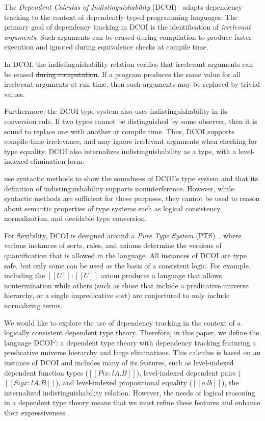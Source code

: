\documentclass[acmsmall, screen=true, nonacm=true,
  review=\ifpublic false\else true\fi,
  anonymous=\ifanonymous true\else false\fi
]{acmart}
\makeatletter
\newcommand{\dcoi}{DCOI\@\xspace}
\newcommand{\name}{\texorpdfstring{DCOI$^{\omega}$\@\xspace}{DCOI-omega}}
\newcommand{\longname}{Dependent Calculus of Indistinguishability\@\xspace}
\providecommand{\DIFadd}[1]{{\protect\color{blue}\uwave{#1}}} %
\providecommand{\DIFdel}[1]{{\protect\color{red}\sout{#1}}}                      %
\providecommand{\DIFaddbegin}{} %
\providecommand{\DIFaddend}{} %
\providecommand{\DIFdelbegin}{} %
\providecommand{\DIFdelend}{} %
\makeatother
\begin{document}
The \emph{\longname} (\dcoi)~\cite{liu:dcoi} adapts dependency tracking to the
context of dependently typed programming languages. The primary goal of
dependency tracking in \dcoi is the identification of \emph{irrelevant
  arguments}.  Such arguments can be erased during compilation to produce
faster execution and ignored during equivalence checks at compile time.

In \dcoi, the indistinguishability relation verifies that irrelevant arguments
can be erased \DIFdelbegin \DIFdel{during computation}\DIFdelend \DIFaddbegin \DIFadd{when executed}\DIFaddend . If a program produces the same value for all
irrelevant arguments at run time, then such arguments may
be replaced by trivial values.

Furthermore, the \dcoi type system also uses indistinguishability in its
conversion rule. If two types cannot be distinguished by some observer, then
it is sound to replace one with another at compile time. Thus, \dcoi supports
compile-time irrelevance, and may ignore irrelevant arguments when checking
for type equality. \dcoi also internalizes indistinguishability as a type,
with a level-indexed elimination form.

\citet{liu:dcoi} use syntactic methods to show the soundness of \dcoi's type
system and that its definition of indistinguishability supports
noninterference. However, while syntactic methods are sufficient for these
purposes, they cannot be used to reason about semantic properties of type
systems such as logical consistency, normalization, and decidable
type conversion.

For flexibility, \dcoi is designed around a \emph{Pure Type System}
(PTS)~\citep{barendregt:PTS},
where various instances of sorts, rules, and axioms determine the versions of
quantification that is allowed in the language. All instances of \dcoi are
type safe, but only some can be used as the basis of a consistent logic. For
example, including the $[[U]] : [[U]]$ axiom produces a language that allows
nontermination while others (such as those that include a predicative universe
hierarchy, or a single impredicative sort) are conjectured to only
include normalizing terms.

We would like to explore the use of dependency tracking in the context of a
logically consistent dependent type theory.  Therefore, in this paper, we
define the language \name: a dependent type theory with dependency tracking
featuring a predicative universe hierarchy and large eliminations.  This
calculus is based on an instance of \dcoi and includes many of its features,
such as level-indexed dependent function types ($[[Pi x : l A . B]]$),
level-indexed dependent pairs ($[[Sig x : l A. B]]$), and level-indexed
propositional equality ($[[a ~l b]]$), the internalized indistinguishability
relation. However, the needs of logical reasoning in a dependent type theory
means that we must refine these features and enhance their expressiveness.
\end{document}
